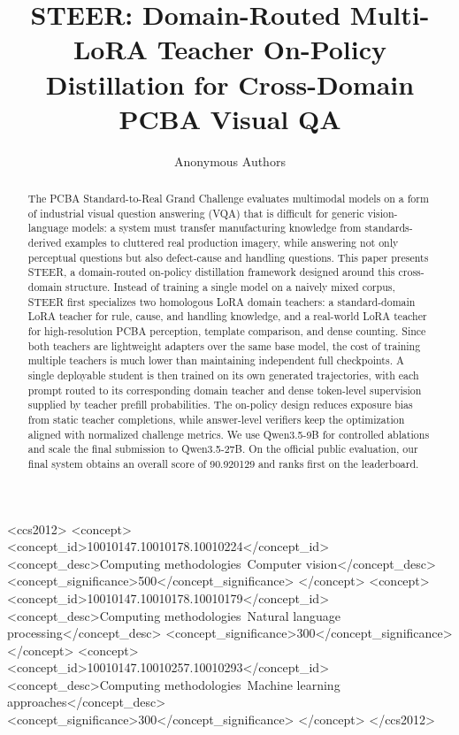 \documentclass[sigconf, screen, review, anonymous]{acmart}
\begin{document}
\def\method{\textsc{STEER}}
\title{\method: Domain-Routed Multi-LoRA Teacher On-Policy Distillation for Cross-Domain PCBA Visual QA}

\author{Anonymous Authors}

\renewcommand{\shortauthors}{Anonymous et al.}

\begin{abstract}
The PCBA Standard-to-Real Grand Challenge evaluates multimodal models on a form of industrial visual question answering (VQA) that is difficult for generic vision-language models: a system must transfer manufacturing knowledge from standards-derived examples to cluttered real production imagery, while answering not only perceptual questions but also defect-cause and handling questions. This paper presents \method{}, a domain-routed on-policy distillation framework designed around this cross-domain structure. Instead of training a single model on a naively mixed corpus, \method{} first specializes two homologous LoRA domain teachers: a standard-domain LoRA teacher for rule, cause, and handling knowledge, and a real-world LoRA teacher for high-resolution PCBA perception, template comparison, and dense counting. Since both teachers are lightweight adapters over the same base model, the cost of training multiple teachers is much lower than maintaining independent full checkpoints. A single deployable student is then trained on its own generated trajectories, with each prompt routed to its corresponding domain teacher and dense token-level supervision supplied by teacher prefill probabilities. The on-policy design reduces exposure bias from static teacher completions, while answer-level verifiers keep the optimization aligned with normalized challenge metrics. We use Qwen3.5-9B for controlled ablations and scale the final submission to Qwen3.5-27B. On the official public evaluation, our final system obtains an overall score of 90.920129 and ranks first on the leaderboard.
\end{abstract}

\begin{CCSXML}
<ccs2012>
   <concept>
       <concept_id>10010147.10010178.10010224</concept_id>
       <concept_desc>Computing methodologies~Computer vision</concept_desc>
       <concept_significance>500</concept_significance>
       </concept>
   <concept>
       <concept_id>10010147.10010178.10010179</concept_id>
       <concept_desc>Computing methodologies~Natural language processing</concept_desc>
       <concept_significance>300</concept_significance>
       </concept>
   <concept>
       <concept_id>10010147.10010257.10010293</concept_id>
       <concept_desc>Computing methodologies~Machine learning approaches</concept_desc>
       <concept_significance>300</concept_significance>
       </concept>
</ccs2012>
\end{CCSXML}
\end{document}
